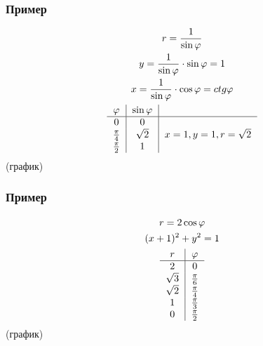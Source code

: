 \documentclass{article}
\begin{document}
\subsubsection{Пример}
\begin{gather*}
    r = \frac{1}{\sin \varphi}                                  \\
    y = \frac{1}{\sin \varphi} \cdot \sin \varphi = 1           \\
    x = \frac{1}{\sin \varphi} \cdot \cos \varphi = ctg \varphi \\
    \begin{tabular}{c|c|c}
        $\varphi$       & $\sin \varphi$ &                              \\
        \hline
        $0$             & $0$            &                              \\
        $\frac{\pi}{4}$ & $\sqrt{2}$     & $x = 1, y = 1, r = \sqrt{2}$ \\
        $\frac{\pi}{2}$ & $1$            &
    \end{tabular}
\end{gather*}
(график)

\subsubsection{Пример}
\begin{gather*}
    r = 2\cos \varphi \\
    (x + 1)^2 + y^2 = 1 \\
    \begin{tabular}{c|c}
        $r$        & $\varphi$       \\
        \hline
        $2$        & $0$             \\
        $\sqrt{3}$ & $\frac{\pi}{6}$ \\
        $\sqrt{2}$ & $\frac{\pi}{4}$ \\
        $1$        & $\frac{\pi}{3}$ \\
        $0$        & $\frac{\pi}{2}$
    \end{tabular}
\end{gather*}
(график)
\end{document}
